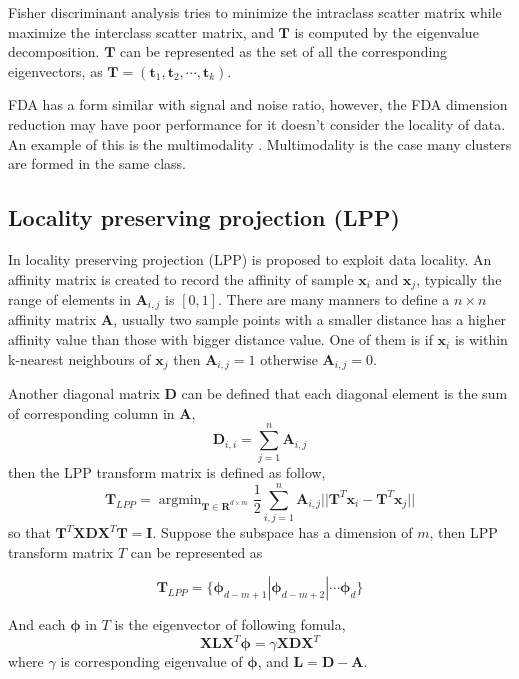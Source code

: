 Fisher discriminant analysis tries to minimize the intraclass scatter matrix while maximize the interclass scatter matrix, and $\bm{T}$ is computed by the eigenvalue decomposition. $\bm{T}$ can be represented as the set of all the corresponding eigenvectors, as $ \bm{T} = (\bm{t}_1,\bm{t}_2,\cdots,\bm{t}_k)$.

FDA has a form similar with signal and noise ratio, however, the FDA dimension reduction may have poor performance for it doesn't consider the locality of data. An example of this is the multimodality \cite{KLFDA}. Multimodality is the case many clusters are formed in the same class. 
\subsection{Locality preserving projection (LPP)}

In \cite{LPP} locality preserving projection (LPP) is proposed to exploit data locality. An affinity matrix is created to record the affinity of sample $\bm{x}_i$ and $\bm{x}_j$,  typically the range of elements in $\bm{A}_{i,j}$ is $[0,1]$. There are many manners to define a $n \times n$ affinity matrix $\bm{A}$, usually two sample points with a smaller distance has a higher affinity value than those with bigger distance value. One of them is if  $\bm{x}_i$ is within k-nearest neighbours of $\bm{x}_j$ then $\bm{A}_{i,j} = 1$ otherwise  $\bm{A}_{i,j} = 0$.  

Another diagonal matrix $\bm{D}$ can be defined that each diagonal element is the sum of corresponding column in $\bm{A}$,
\begin{equation}
\bm{D}_{i,i} = \mathop{\sum}_{j=1}^n \bm{A}_{i, j} 
\end{equation}
then the LPP transform matrix is defined as follow,
\begin{equation}
\bm{T}_{LPP} = \mathop{\arg\min}_{\bm{T}\in\bm{R}^{d\times m}} \frac{1}{2}\mathop{\sum}_{i, j= 1}^n \bm{A}_{i,j} ||\bm{T}^T\bm{x}_i - \bm{T}^T\bm{x}_j||
\end{equation}
so that $ \bm{T}^T\bm{X}\bm{D}\bm{X}^T\bm{T} = \bm{I} $.
Suppose the subspace has a dimension of $m$, then LPP transform matrix $T$ can be represented as 

$$\bm{T}_{LPP} = \{ \bm{\phi}_{d-m+1} | \bm{\phi}_{d-m+2} | \cdots \bm{\phi}_{d}\} $$

And each $\bm{\phi}$ in $T$ is the eigenvector of following fomula,
 \begin{equation}
\bm{X}\bm{L}\bm{X}^T\bm{\phi} = \gamma\bm{X}\bm{D}\bm{X}^T
\end{equation}
where $\gamma$ is corresponding eigenvalue of $\bm{\phi}$, and $\bm{L} = \bm{D} - \bm{A}$.

